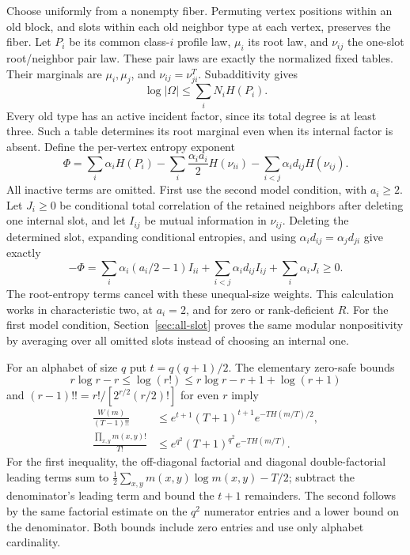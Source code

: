 Choose uniformly from a nonempty fiber. Permuting vertex positions
within an old block, and slots within each old neighbor type at each
vertex, preserves the fiber. Let $P_i$ be its common class-$i$
profile law, $\mu_i$ its root law, and $\nu_{ij}$ the one-slot
root/neighbor pair law. These pair laws are exactly the normalized
fixed tables. Their marginals are $\mu_i,\mu_j$, and
$\nu_{ij}=\nu_{ji}^T$. Subadditivity gives
\begin{equation}\label{eq:unknown-fiber-entropy}
 \log|\Omega|\le\sum_iN_iH(P_i).
\end{equation}
Every old type has an active incident factor, since its total degree
is at least three. Such a table determines its root marginal even
when its internal factor is absent.
Define the per-vertex entropy exponent
\[
 \Phi=\sum_i\alpha_iH(P_i)
 -\sum_i\frac{\alpha_i a_i}{2}H(\nu_{ii})
 -\sum_{i<j}\alpha_id_{ij}H(\nu_{ij}).
\]
All inactive terms are omitted. First use the second model condition,
with $a_i\ge2$. Let $J_i\ge0$ be conditional total
correlation of the retained neighbors after deleting one internal
slot, and let $I_{ij}$ be mutual information in $\nu_{ij}$.
Deleting the determined slot, expanding conditional entropies, and
using $\alpha_id_{ij}=\alpha_jd_{ji}$ give exactly
\begin{equation}\label{eq:unknown-entropy}
 -\Phi=\sum_i\alpha_i(a_i/2-1)I_{ii}
       +\sum_{i<j}\alpha_id_{ij}I_{ij}
       +\sum_i\alpha_iJ_i\ge0.
\end{equation}
The root-entropy terms cancel with these unequal-size weights.
This calculation works in characteristic two, at $a_i=2$, and for
zero or rank-deficient $R$. For the first model condition,
Section~\ref{sec:all-slot} proves the same modular nonpositivity
by averaging over all omitted slots instead of choosing an internal one.

For an alphabet of size $q$ put $t=q(q+1)/2$.
The elementary zero-safe bounds
\[
 r\log r-r\le\log(r!)\le r\log r-r+1+\log(r+1)
\]
and $(r-1)!!=r!/[2^{r/2}(r/2)!]$ for even $r$ imply
\begin{align*}
 \frac{W(m)}{(T-1)!!}
 &\le e^{t+1}(T+1)^{t+1}e^{-TH(m/T)/2},\\
 \frac{\prod_{x,y}m(x,y)!}{T!}
 &\le e^{q^2}(T+1)^{q^2}e^{-TH(m/T)}.
\end{align*}
For the first inequality, the off-diagonal factorial and diagonal
double-factorial leading terms sum to
$\frac12\sum_{x,y}m(x,y)\log m(x,y)-T/2$;
subtract the denominator's leading term and bound the $t+1$
remainders. The second follows by the same factorial estimate on
the $q^2$ numerator entries and a lower bound on the denominator.
Both bounds include zero entries and use only alphabet cardinality.

